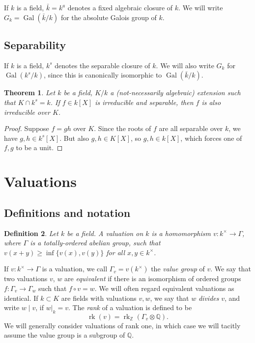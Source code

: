 \documentclass{article}
\DeclareMathOperator{\gal}{Gal}
\DeclareMathOperator{\rk}{rk}
\newcommand{\dQ}{\mathbb{Q}}
\newcommand{\dZ}{\mathbb{Z}}
\newtheorem{definition}{Definition}
\newtheorem{theorem}[definition]{Theorem}
\numberwithin{definition}{subsection}
\begin{document}
If $k$ is a field, $\bar k = k^a$ denotes a fixed algebraic closure of $k$. We 
will write $G_k=\gal(\bar k/k)$ for the absolute Galois group of $k$. 





\subsection{Separability}

If $k$ is a field, $k^s$ denotes the separable closure of $k$. We will also 
write $G_k$ for $\gal(k^s/k)$, since this is canonically isomorphic to 
$\gal(\bar k/k)$. 

\begin{theorem}\label{separability-1}
Let $k$ be a field, $K/k$ a (not-necessarily algebraic) extension such that 
$K\cap k^s=k$. If $f\in k[X]$ is irreducible and separable, then $f$ is also 
irreducible over $K$. 
\end{theorem}
\begin{proof}
Suppose $f = g h$ over $K$. Since the roots of $f$ are all separable over $k$, 
we have $g,h\in k^s[X]$. But also $g,h\in K[X]$, so $g,h\in k[X]$, which 
forces one of $f,g$ to be a unit. 
\end{proof}










\section{Valuations}





\subsection{Definitions and notation}

\begin{definition}
Let $k$ be a field. A \emph{valuation} on $k$ is a homomorphism 
$v:k^\times \to \Gamma$, where $\Gamma$ is a totally-ordered abelian group, 
such that $v(x+y)\geqslant\inf\{v(x),v(y)\}$ for all $x,y\in k^\times$. 
\end{definition}

If $v:k^\times \to \Gamma$ is a valuation, we call $\Gamma_v=v(k^\times)$ the 
\emph{value group} of $v$. We say that two valuations $v$, $w$ are 
\emph{equivalent} if there is an isomorphism of ordered groups 
$f:\Gamma_v\to \Gamma_w$ such that $f\circ v=w$. We will often regard 
equivalent valuations as identical. If $k\subset K$ are fields with valuations 
$v,w$, we say that $w$ \emph{divides} $v$, and write $w\mid v$, if $w|_k=v$. 
The \emph{rank} of a valuation is defined to be 
\[
  \rk(v)=\rk_\dZ(\Gamma_v\otimes\dQ) \text{.}
\]
We will generally consider valuations of rank one, in which case we will 
tacitly assume the value group is a subgroup of $\dQ$. 
\end{document}
